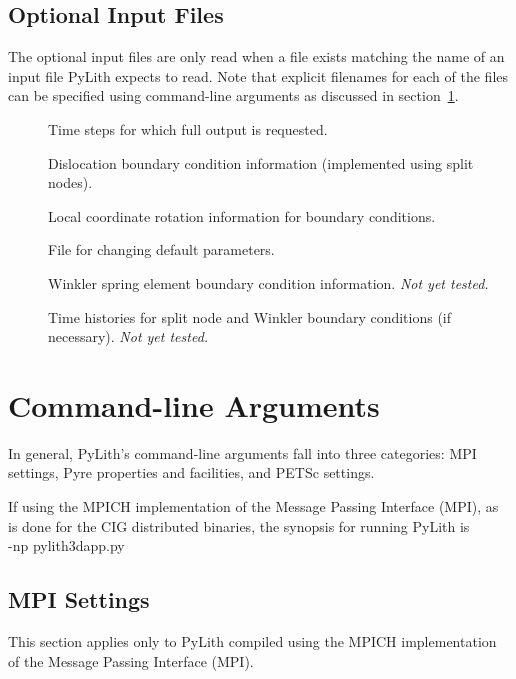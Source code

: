 \subsection{Optional Input Files}

The optional input files are only read when a file exists matching the
name of an input file PyLith expects to read.  Note that explicit
filenames for each of the files can be specified using command-line
arguments as discussed in section~\ref{sec:commandline:args}.

\begin{description}
\item[] Time steps for which full output is
  requested.
\item[] Dislocation boundary condition information
  (implemented using split nodes).
\item[] Local coordinate rotation information for
  boundary conditions.
\item[] File for changing default parameters.
\item[] Winkler spring element boundary condition
  information. {\em Not yet tested.}
\item[] Time histories for split node and Winkler boundary
  conditions (if necessary). {\em Not yet
    tested.}
\end{description}

\section{Command-line Arguments}
\label{sec:commandline:args}

In general, PyLith's command-line arguments fall into three
categories: MPI settings, Pyre properties and facilities, and PETSc
settings.

If using the MPICH implementation of the Message Passing Interface
(MPI), as is done for the CIG distributed binaries, the synopsis for
running PyLith is \\
 -np  pylith3dapp.py
 

\subsection{MPI Settings}

\begin{warning}
  This section applies only to PyLith compiled using the MPICH
  implementation of the Message Passing Interface (MPI).
\end{warning}


